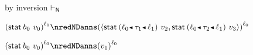 {\begin{lamportproof*}
    \begin{pfproof}
        \begin{pfproof}
          by inversion $\vdash_{\mathsf{N}}$
        \end{pfproof}
      \qedstep
        \begin{pfproof}
          $\obars{\estab{\sbnd_0}{\svalue_0}}{\sowner_0} \nredNDanns \obars{\epair{\estab{\obnd{\sowner_0}{\stype_1}{\sowner_1}}{\svalue_2}}{\estab{\obnd{\sowner_0}{\stype_2}{\sowner_1}}{\svalue_3}}}{\sowner_0}$
        \end{pfproof}
    \end{pfproof}

    \begin{pfproof}
      \qedstep
        \begin{pfproof}
          $\obars{\estab{\sbnd_0}{\svalue_0}}{\sowner_0} \nredNDanns \obars{\svalue_1}{\sowner_0}$
        \end{pfproof}
    \end{pfproof}

\end{lamportproof*}}

